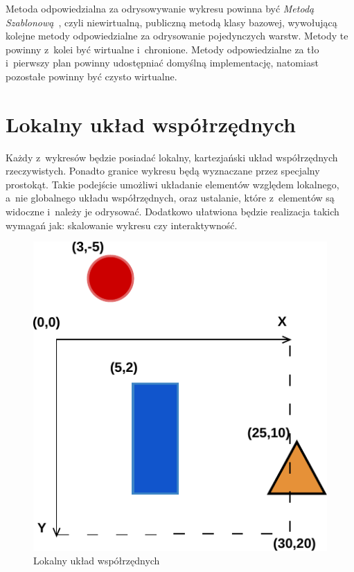Metoda odpowiedzialna za odrysowywanie wykresu powinna być \textit{Metodą Szablonową}~\cite[264-268]{Patterns}, czyli niewirtualną, publiczną metodą klasy bazowej, wywołującą kolejne metody odpowiedzialne za odrysowanie pojedynczych warstw. Metody te powinny z~kolei być wirtualne i~chronione.
Metody odpowiedzialne za tło i~pierwszy plan powinny udostępniać domyślną implementację, natomiast pozostałe powinny być czysto wirtualne.

\section{Lokalny układ współrzędnych}
Każdy z~wykresów będzie posiadać lokalny, kartezjański układ współrzędnych rzeczywistych. Ponadto granice wykresu będą wyznaczane przez specjalny prostokąt. Takie podejście umożliwi układanie elementów względem lokalnego, a~nie globalnego układu współrzędnych, oraz ustalanie, które z~elementów są widoczne i~należy je odrysować. Dodatkowo ułatwiona będzie realizacja takich wymagań jak: skalowanie wykresu czy interaktywność. 

\begin{figure}
\centering
\caption{Lokalny układ współrzędnych}\label{rys:uklad:wspolrzednych}
\includegraphics{img/uklad_wspolrzednych.pdf}
\end{figure}

